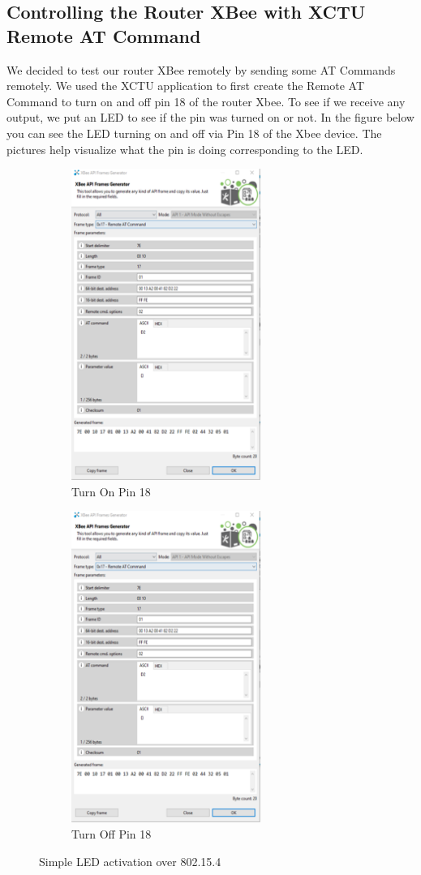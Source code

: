 \documentclass[a4paper,11pt]{report}
\begin{document}
	\subsection{Controlling the Router XBee with XCTU Remote AT Command}
	\par We decided to test our router XBee remotely by sending some AT Commands remotely. We used the XCTU application to first create the Remote AT Command to turn on and off pin 18 of the router Xbee. To see if we receive any output, we put an LED to see if the pin was turned on or not. In the figure below you can see the LED turning on and off via Pin 18 of the Xbee device. The pictures help visualize what the pin is doing corresponding to the LED.
	\begin{figure}[h!]
		\centering
		\begin{subfigure}[t]{0.45\textwidth}
			\centering
			\includegraphics[height=4in]{xbeeXctu1.png}
			\caption{Turn On Pin 18}
		\end{subfigure}
		\begin{subfigure}[t]{0.45\textwidth}
			\centering
			\includegraphics[height=4in]{xbeeXctu1.png}
			\caption{Turn Off Pin 18}
		\end{subfigure}
		\caption{Simple LED activation over 802.15.4}
	\end{figure}
\end{document}
